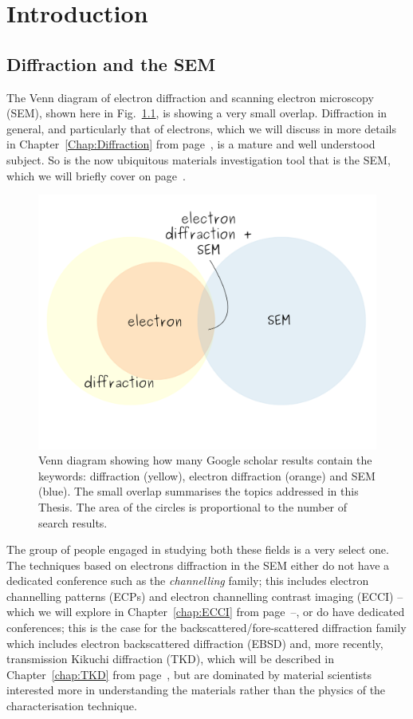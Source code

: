 \chapter{Introduction}




\section{Diffraction and the SEM}


The Venn diagram of electron diffraction and scanning electron microscopy (SEM), shown here in Fig.~\ref{Fig:Venn}, is showing a very small overlap. Diffraction in general, and particularly that of electrons, which  we will discuss in more details in Chapter~\ref{Chap:Diffraction} from page~\pageref{Chap:Diffraction}, is a mature and well understood subject. So is the now ubiquitous materials investigation tool that is the SEM, which we will briefly cover on page~\pageref{sec:sem}. 

\begin{figure}[ht]
\centering
\includegraphics[width=0.71\linewidth]{Figures/VenSEM.png}
\caption[SEM and electron diffraction Venn diagram.]{Venn diagram showing how many Google scholar results contain the keywords: diffraction (yellow), electron diffraction (orange) and SEM (blue). The small overlap  summarises the topics addressed in this Thesis. The area of the circles is proportional to the number of search results.}
\label{Fig:Venn}
\end{figure}

The group of people engaged in studying both these fields is a very select one. The techniques based on electrons diffraction in the SEM either do not have a dedicated conference such as the \textit{channelling} family; this includes electron channelling patterns (ECPs) and electron channelling contrast imaging (ECCI) -- which we will explore in Chapter~\ref{chap:ECCI} from page~\pageref{chap:ECCI}--, or do have dedicated conferences; this is the case for the backscattered/fore-scattered diffraction family which includes electron backscattered diffraction (EBSD) and, more recently, transmission Kikuchi diffraction (TKD), which will be described in Chapter~\ref{chap:TKD} from page~\pageref{chap:TKD}, but are dominated by material scientists interested more in understanding the materials rather than the physics of the characterisation technique. 



